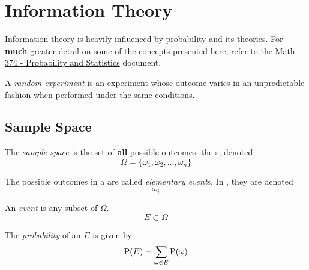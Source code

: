 \section{Information Theory}\label{sec:Information_Theory}
Information theory is heavily influenced by probability and its theories.
For \textbf{much} greater detail on some of the concepts presented here, refer to the \href{file:./Math_374-Reference_Sheet.pdf}{Math 374 - Probability and Statistics} document.

\begin{definition}\label{def:Random_Experiment}
  A \emph{random experiment} is an experiment whose outcome varies in an unpredictable fashion when performed under the same conditions.
\end{definition}

\subsection{Sample Space}\label{subsec:Sample_Space}
\begin{definition}\label{def:Sample_Space}
  The \emph{sample space} is the set of \textbf{all} possible outcomes, the s, denoted
  \begin{equation}\label{eq:Sample_Space}
    \Omega = \lbrace \omega_{1}, \omega_{2}, \ldots, \omega_{n} \rbrace
  \end{equation}
\end{definition}

\begin{definition}\label{def:Elementary_Event}
  The possible outcomes in a  are called \emph{elementary event}s.
  In , they are denoted
  \begin{equation}\label{eq:Elementary_Event}
    \omega_{i}
  \end{equation}
\end{definition}

\begin{definition}[Event]\label{def:Event}
  An \emph{event} is any subset of $\Omega$.
  \begin{equation}\label{eq:Event}
    E \subset \Omega
  \end{equation}
\end{definition}

\begin{definition}[Probability]\label{def:Probability}
  The \emph{probability} of an  $E$ is given by
  \begin{equation}\label{eq:Probability}
    \operatorname{\operatorname{P}}(E) = \sum\limits_{\omega \in E} \operatorname{\operatorname{P}}(\omega)
  \end{equation}
\end{definition}

